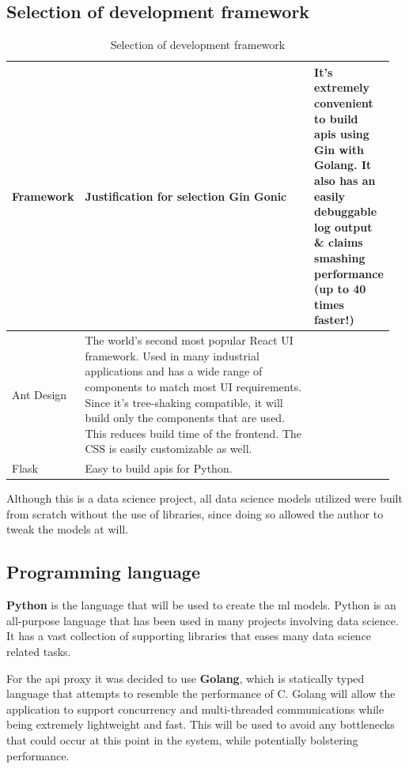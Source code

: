 \subsection{Selection of development framework}
\vspace{-4mm}
\begin{longtable}{|p{0.16\linewidth}|p{0.8\linewidth}|}
\caption{Selection of development framework}\\ 
\hline
\textbf{Framework} & \textbf{Justification for selection}\endfirsthead 
\hline
Gin Gonic & It's extremely convenient to build \gls{api}s using Gin with Golang. It also has an easily debuggable log output \& claims smashing performance (up to 40 times faster!)\\
\hline
Ant Design & The world's second most popular React UI framework. Used in many industrial applications and has a wide range of components to match most UI requirements. Since it's tree-shaking compatible, it will build only the components that are used. This reduces build time of the frontend. The CSS is easily customizable as well. \\ 
\hline
Flask & Easy to build \gls{api}s for Python. \\ 
\hline
\end{longtable}

Although this is a data science project, all data science models utilized were built from scratch without the use of libraries, since doing so allowed the author to tweak the models at will.


\subsection{Programming language}
\textbf{Python} is the language that will be used to create the \gls{ml} models.  Python is an all-purpose language that has been used in many projects involving data science. It has a vast collection of supporting libraries that eases many data science related tasks.

For the \gls{api} proxy it was decided to use \textbf{Golang}, which is statically typed language that attempts to resemble the performance of C. Golang will allow the application to support concurrency and multi-threaded communications while being extremely lightweight and fast. This will be used to avoid any bottlenecks that could occur at this point in the system, while potentially bolstering performance.

